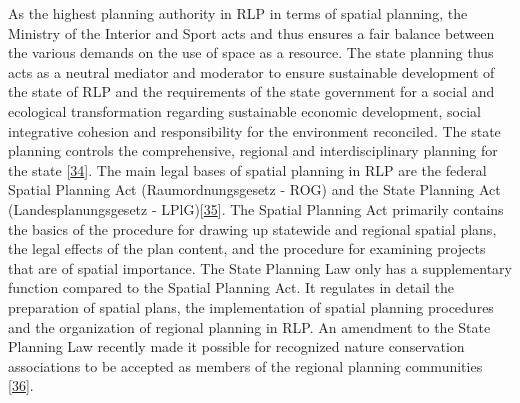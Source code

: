 \documentclass[a4paper,11pt]{article}
\begin{document}
As the highest planning authority in RLP in terms of spatial planning, the Ministry of the Interior and Sport acts and thus ensures a fair balance between the various demands on the use of space as a resource. The state planning thus acts as a neutral mediator and moderator to ensure sustainable development of the state of RLP and the requirements of the state government for a social and ecological transformation regarding sustainable economic development, social integrative cohesion and responsibility for the environment reconciled. The state planning controls the comprehensive, regional and interdisciplinary planning for the state {[}\protect\hyperlink{ref-MinisteriumdesInnernundfurSport.2021}{34}{]}. The main legal bases of spatial planning in RLP are the federal Spatial Planning Act (Raumordnungsgesetz - ROG) and the State Planning Act (Landesplanungsgesetz - LPlG){[}\protect\hyperlink{ref-BundesministeriumderJustizundfurVerbraucherschutz.2008}{35}{]}. The Spatial Planning Act primarily contains the basics of the procedure for drawing up statewide and regional spatial plans, the legal effects of the plan content, and the procedure for examining projects that are of spatial importance. The State Planning Law only has a supplementary function compared to the Spatial Planning Act. It regulates in detail the preparation of spatial plans, the implementation of spatial planning procedures and the organization of regional planning in RLP. An amendment to the State Planning Law recently made it possible for recognized nature conservation associations to be accepted as members of the regional planning communities {[}\protect\hyperlink{ref-MinisteriumderJustizRheinlandPfalz.2003}{36}{]}.
\end{document}
